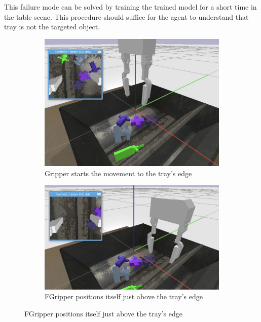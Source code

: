 \begin{enumerate}
    This failure mode can be solved by training the trained model for a short time in the table scene. This procedure should suffice for the agent to understand that tray is not the targeted object.
    \begin{figure}[!htbp]
        \begin{subfigure}{0.33\textwidth}
            \includegraphics[width=\linewidth]{figures/failure/trayedge1}
            \caption{Gripper starts the movement to the tray's edge} \label{fig:table}
        \end{subfigure}%
        \hspace*{\fill}   %
        \begin{subfigure}{0.35\textwidth}
            \includegraphics[width=\linewidth]{figures/failure/trayedge2}
            \caption{FGripper positions itself just above the tray's edge} \label{fig:floor}

\end{subfigure}
\end{figure}
\end{enumerate}
